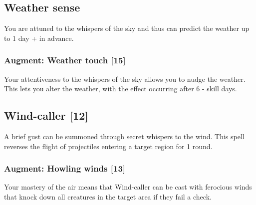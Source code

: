 \subsection{Weather sense}
You are attuned to the whispers of the sky and thus can predict the weather up to 1 day +  in advance.
\subsubsection{Augment: Weather touch [15]}
Your attentiveness to the whispers of the sky allows you to nudge the weather. This lets you alter the weather, with the effect occurring after 6 -  skill days. 


\subsection{Wind-caller [12]}
A brief gust can be summoned through secret whispers to the wind. This spell reverses the flight of projectiles entering a target region for 1 round. 
\subsubsection{Augment: Howling winds [13]}
Your mastery of the air means that Wind-caller can be cast with ferocious winds that knock down all creatures in the target area if they fail a  check.